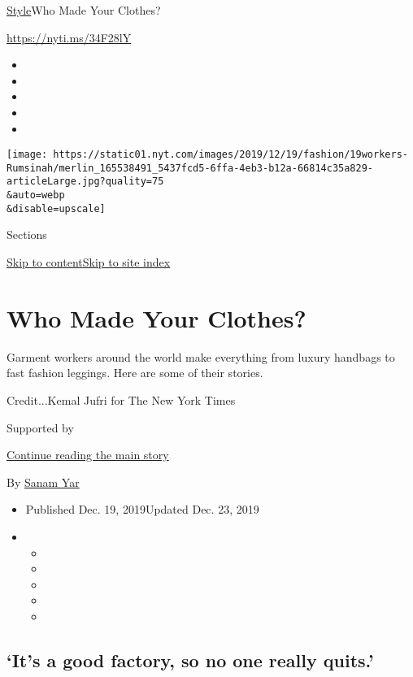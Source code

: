 \href{/section/style}{Style}\textbar{}Who Made Your Clothes?

\url{https://nyti.ms/34F28lY}

\begin{itemize}
\item
\item
\item
\item
\item
\end{itemize}

\texttt{[image: https://static01.nyt.com/images/2019/12/19/fashion/19workers-Rumsinah/merlin\_165538491\_5437fcd5-6ffa-4eb3-b12a-66814c35a829-articleLarge.jpg?quality=75\\\&auto=webp\\\&disable=upscale]}

Sections

\protect\hyperlink{site-content}{Skip to
content}\protect\hyperlink{site-index}{Skip to site index}

\hypertarget{who-made-your-clothes}{%
\section{Who Made Your Clothes?}\label{who-made-your-clothes}}

Garment workers around the world make everything from luxury handbags to
fast fashion leggings. Here are some of their stories.

Credit...Kemal Jufri for The New York Times

Supported by

\protect\hyperlink{after-sponsor}{Continue reading the main story}

By \href{https://www.nytimes.com/by/sanam-yar}{Sanam Yar}

\begin{itemize}
\item
  Published Dec. 19, 2019Updated Dec. 23, 2019
\item
  \begin{itemize}
  \item
  \item
  \item
  \item
  \item
  \end{itemize}
\end{itemize}

\hypertarget{its-a-good-factory-so-no-one-really-quits}{%
\subsection{`It's a good factory, so no one really
quits.'}\label{its-a-good-factory-so-no-one-really-quits}}

